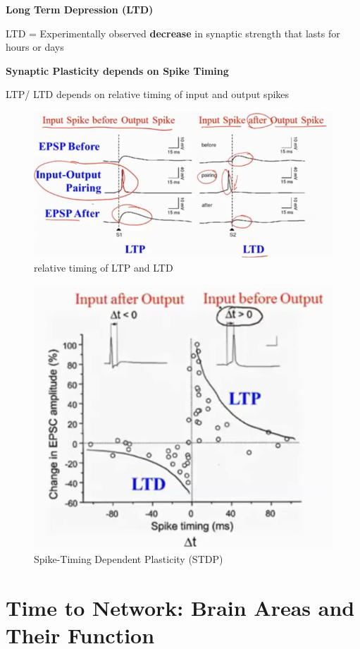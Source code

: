 \documentclass{book}
\begin{document}
\textbf{Long Term Depression (LTD)}

LTD = Experimentally observed \textbf{decrease} in synaptic strength that lasts for hours or days



\textbf{Synaptic Plasticity depends on Spike Timing}

LTP/ LTD depends on relative timing of input and output spikes

\begin{figure}[h]
\centering
\includegraphics[width=0.7\linewidth, height=0.3\textheight]{./figures/LTP1}
\caption{relative timing of LTP and LTD}
\label{fig:LTP1}
\end{figure}

\begin{figure}[h]
\centering
\includegraphics[width=0.7\linewidth, height=0.3\textheight]{./figures/LTPLTD2}
\caption{Spike-Timing Dependent Plasticity (STDP)}
\label{fig:LTPLTD2}
\end{figure}



\section{Time to Network: Brain Areas and Their Function}
\end{document}
